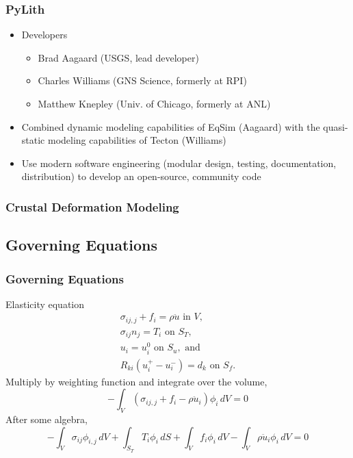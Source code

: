 \documentclass{beamer}
\begin{document}
\begin{frame}
  \frametitle{PyLith}
  \summary{}

  \begin{itemize}
  \item Developers
    \begin{itemize}
    \item Brad Aagaard (USGS, lead developer)
    \item Charles Williams (GNS Science, formerly at RPI)
    \item Matthew Knepley (Univ. of Chicago, formerly at ANL)
    \end{itemize}
  \item Combined dynamic modeling capabilities of EqSim (Aagaard) with
    the quasi-static modeling capabilities of Tecton (Williams)
  \item Use modern software engineering (modular design, testing,
    documentation, distribution) to develop an open-source, community code
  \end{itemize}

\end{frame}


\begin{frame}
  \frametitle{Crustal Deformation Modeling}

  
  
\end{frame}


\subsection{Governing Equations}

\begin{frame}
  \frametitle{Governing Equations}
  \summary{}

  \vfill
  Elasticity equation
  \begin{gather}
    \sigma_{ij,j} + f_i = \rho \ddot{u} \text{ in } V, \\
    \sigma_{ij} n_j = T_i \text{ on } S_T, \\
    u_i = u_i^0 \text{ on } S_u, \text{ and } \\
    R_{ki}(u^{+}_i - u^{-}_i) = d_k \text{ on } S_f.
  \end{gather}
  Multiply by weighting function and integrate over the volume,
  \begin{equation}
    -\int_V (\sigma_{ij,j} + f_i - \rho \ddot{u}_i) \phi_i \, dV = 0
  \end{equation}
  After some algebra,
  \begin{equation}
    -\int_V \sigma_{ij} \phi_{i,j} \, dV 
    + \int_{S_T} T_i \phi_i\, dS
    + \int_V f_i \phi_i \, dV 
    - \int_V \rho \ddot{u}_i \phi_i \, dV = 0
  \end{equation}
  \vfill
  
\end{frame}
\end{document}

